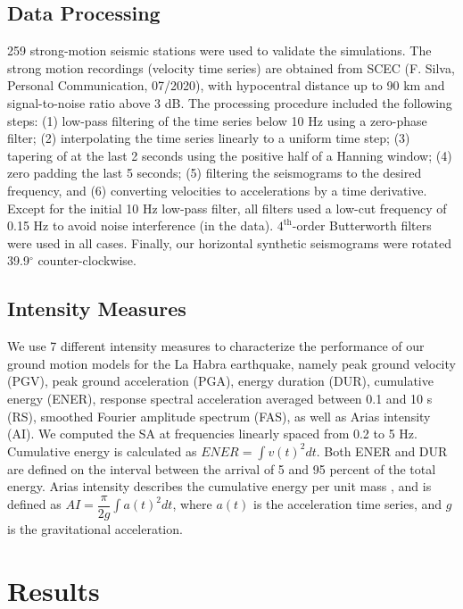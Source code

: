 \subsection{Data Processing}
259 strong-motion seismic stations were used to validate the simulations. The strong motion recordings (velocity time series) are obtained from SCEC (F. Silva, Personal Communication, 07/2020), with hypocentral distance up to 90 km and signal-to-noise ratio above 3 dB. The processing procedure included the following steps: (1) low-pass filtering of the time series below 10 Hz using a zero-phase filter; (2) interpolating the time series linearly to a uniform time step; (3) tapering of at the last 2 seconds using the positive half of a Hanning window; (4) zero padding the last 5 seconds; (5) filtering the seismograms to the desired frequency, and (6) converting velocities to accelerations by a time derivative. Except for the initial 10 Hz low-pass filter, all filters used a low-cut frequency of 0.15 Hz to avoid noise interference (in the data). $4^{\text{th}}$-order Butterworth filters were used in all cases. Finally, our horizontal synthetic seismograms were rotated 39.9$^\circ$ counter-clockwise.

\subsection{Intensity Measures}
We use 7 different intensity measures to characterize the performance of our ground motion models for the La Habra earthquake, namely peak ground velocity (PGV), peak ground acceleration (PGA), energy duration (DUR), cumulative energy (ENER), response spectral acceleration averaged between 0.1 and 10 s (RS), smoothed Fourier amplitude spectrum (FAS), as well as Arias intensity (AI). We computed the SA at frequencies linearly spaced from 0.2 to 5 Hz. Cumulative energy is calculated as $E N E R=\int v(t)^{2} d t$. Both ENER and DUR are defined on the interval between the arrival of 5 and 95 percent of the total energy. Arias intensity describes the cumulative energy per unit mass \citep{arias1970measure}, and is defined as $AI=\dfrac{\pi}{2 g} \int a(t)^{2} d t$, where $a(t)$ is the acceleration time series, and $g$ is the gravitational acceleration. 

\section{Results}
